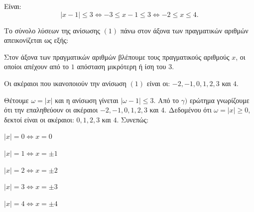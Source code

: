 
\begin{alist}
\item Είναι:
\[|x - 1| \le 3 \Leftrightarrow -3 \le x - 1 \le 3 \Leftrightarrow -2 \le x \le 4.\]

\item Το σύνολο λύσεων της ανίσωσης $(1)$ πάνω στον άξονα των πραγματικών αριθμών
απεικονίζεται ως εξής:
\begin{center}
\end{center}
Στον άξονα των πραγματικών αριθμών βλέπουμε τους πραγματικούς αριθμούς $x$, οι οποίοι
απέχουν από το $1$ απόσταση μικρότερη ή ίση του $3$.

\item Οι ακέραιοι που ικανοποιούν την ανίσωση $(1)$ είναι οι: $-2, -1, 0, 1, 2, 3$ και $4$.

\item Θέτουμε $\omega = |x|$ και η ανίσωση γίνεται $|\omega - 1| \le 3$. Από το $\gamma)$ ερώτημα γνωρίζουμε ότι την
επαληθεύουν οι ακέραιοι $-2, -1, 0, 1, 2, 3$ και $4$. Δεδομένου ότι $\omega = |x| \ge 0$, δεκτοί είναι οι
ακέραιοι: $0, 1, 2, 3$ και $4$. Συνεπώς:
\begin{bulletlist}
\item $|x| = 0 \Leftrightarrow x = 0$
\item $|x| = 1 \Leftrightarrow x = \pm 1$
\item $|x| = 2 \Leftrightarrow x = \pm 2$
\item $|x| = 3 \Leftrightarrow x = \pm 3$
\item $|x| = 4 \Leftrightarrow x = \pm 4$
\end{bulletlist}
\end{alist}

